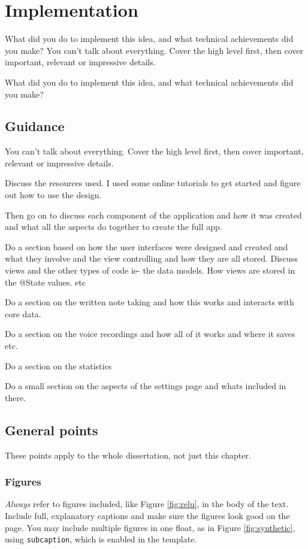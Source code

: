 \documentclass{l4proj}
\begin{document}
\chapter{Implementation}
What did you do to implement this idea, and what technical achievements did you make?
You can't talk about everything. Cover the high level first, then cover important, relevant or impressive details.

What did you do to implement this idea, and what technical achievements did you make?
\section{Guidance}
You can't talk about everything. Cover the high level first, then cover important, relevant or impressive details.

\par 
Discuss the resources used. I used some online tutorials to get started and figure out how to use the design.
\par 
Then go on to discuss each component of the application and how it was created and what all the aspects do
together to create the full app. 
\par 
Do a section based on how the user interfaces were designed and created and what they involve and the view 
controlling and how they are all stored. Discuss views and the other types of code ie- the data models. How 
views are stored in the @State values. etc 
\par 
Do a section on the written note taking and how this works and interacts with core data.
\par 
Do a section on the voice recordings and how all of it works and where it saves etc.
\par 
Do a section on the statistics 
\par 
Do a small section on the aspects of the settings page and whats included in there.


\section{General points}

These points apply to the whole dissertation, not just this chapter.



\subsection{Figures}
\emph{Always} refer to figures included, like Figure \ref{fig:relu}, in the body of the text. Include full, explanatory captions and make sure the figures look good on the page.
You may include multiple figures in one float, as in Figure \ref{fig:synthetic}, using \texttt{subcaption}, which is enabled in the template.
\end{document}
